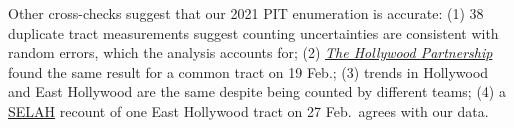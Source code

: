 \documentclass[11pt]{article}
\def\selah{SELAH}
\begin{document}
Other cross-checks suggest that our 2021 PIT enumeration is accurate: (1) 38 duplicate tract measurements 
suggest counting uncertainties are consistent with random errors, which the analysis accounts for; (2) 
\href{https://hollywoodpartnership.com/}{\it The Hollywood Partnership} found the same result for
a common tract on 19 Feb.; (3) trends in Hollywood and East Hollywood are the same despite being counted 
by different teams; (4) a \href{https://selahnch.org}{\selah} recount of one East Hollywood tract on 
27 Feb.\ agrees with our data.
\end{document}
